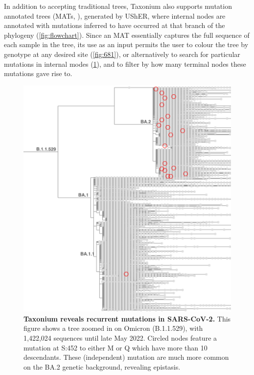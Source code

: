 \documentclass[twocolumn]{bioRxiv}
\begin{document}
In addition to accepting traditional trees, Taxonium also supports mutation annotated trees (MATs, \citet{matutils}), generated by UShER, where internal nodes are annotated with mutations inferred to have occurred at that branch of the phylogeny (\cref{fig:flowchart}). Since an MAT essentially captures the full sequence of each sample in the tree, its use as an input permits the user to colour the tree by genotype at any desired site (\cref{fig:681}), or alternatively to search for particular mutations in internal modes (\cref{fig:452}), and to filter by how many terminal nodes these mutations gave rise to.



\begin{figure}
\begin{center}
\includegraphics[width=\linewidth]{Figures/452_2.png}
\end{center}
\caption{\textbf{Taxonium reveals recurrent mutations in SARS-CoV-2.} This figure shows a tree zoomed in on Omicron (B.1.1.529), with 1,422,024 sequences until late May 2022. Circled nodes feature a mutation at S:452 to either M or Q which have more than 10 descendants. These (independent) mutation are much more common on the BA.2 genetic background, revealing epistasis.}
\label{fig:452}
\end{figure}
\end{document}
